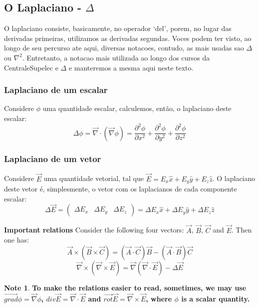 \documentclass[11pt]{article}
\theoremstyle{definition}
\newtheorem{note}{Note}
\begin{document}
\subsection{O Laplaciano - $\Delta$}
O laplaciano consiste, basicamente, no operador `del', porem, no lugar das derivadas primeiras, utilizamos as derivadas segundas.
Voces podem ter visto, ao longo de seu percurso ate aqui, diversas notacoes, contudo, as mais usadas sao $\Delta$ ou $\nabla ^2$. Entretanto,
a notacao mais utilizada ao longo dos cursos da CentraleSupelec e $\Delta$ e manteremos a mesma aqui neste texto.
\subsubsection{Laplaciano de um escalar}
Considere $\phi$ uma quantidade escalar, calculemos, então, o laplaciano deste escalar:
\begin{equation}
    \Delta \phi = \vec{\nabla} \cdot \left(\vec{\nabla} \phi\right)
                = \frac{\partial^2 \phi}{\partial x^2}+\frac{\partial^2 \phi}{\partial y^2}+\frac{\partial^2 \phi}{\partial z^2}
\end{equation}
\subsubsection{Laplaciano de um vetor}
Considere $\vec{E}$ uma quantidade vetorial, tal que $\vec{E} = E_{x}\hat{x}+E_{y}\hat{y}+E_{z}\hat{z}$. O laplaciano deste vetor é, simplesmente, o vetor com os laplacianos de cada componente escalar:
\begin{equation}
    \Delta \vec{E} = \left(\begin{matrix}
                        \Delta E_{x} & \Delta E_{y} & \Delta E_{z}
                     \end{matrix}\right) = \Delta E_{x}\hat{x} + \Delta E_{y}\hat{y} + \Delta E_{z}\hat{z}
\end{equation}
\begin{shaded}
\textbf{Important relations}\newline
Consider the following four vectors: $\vec{A}$, $\vec{B}$, $\vec{C}$ and $\vec{E}$. Then one has:
\begin{equation}
\vec{A} \times \left(\vec{B} \times \vec{C}\right) = \left(\vec{A} \cdot \vec{C}\right)\vec{B} - \left(\vec{A} \cdot \vec{B}\right)\vec{C}
\end{equation}
\begin{equation}
\vec{\nabla} \times \left(\vec{\nabla} \times \vec{E}\right) = \vec{\nabla}\left(\vec{\nabla} \cdot \vec{E}\right) - \Delta \vec{E}
\end{equation}
\begin{note}
\textbf{To make the relations easier to read, sometimes, we may use $\vec{grad} \phi = \vec{\nabla}\phi$, $div \vec{E}= \vec{\nabla} \cdot \vec{E}$ and $\vec{rot} \vec{E}= \vec{\nabla} \times \vec{E}$, where $\phi$ is a scalar quantity.}
\end{note}
\end{shaded}
\newpage
\end{document}
